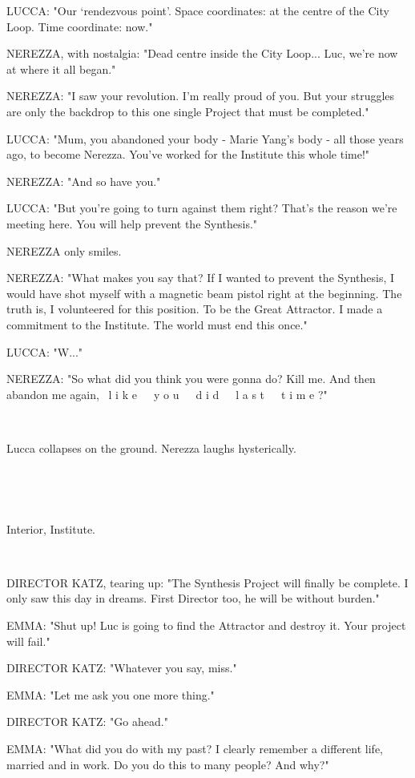 \documentclass[11pt]{article}
\begin{document}
LUCCA: "Our `rendezvous point'.
Space coordinates: at the centre of the City Loop. 
Time coordinate: now."

NEREZZA, with nostalgia: "Dead centre inside the City Loop...
Luc, we're now at where it all began."

NEREZZA: "I saw your revolution. 
I'm really proud of you.
But your struggles are only the backdrop to this one single Project that must be completed."

LUCCA: "Mum, you abandoned your body - Marie Yang's body - all those years ago, to become Nerezza.
You've worked for the Institute this whole time!"

NEREZZA: "And so have you."

LUCCA: "But you're going to turn against them right?
That's the reason we're meeting here.
You will help prevent the Synthesis."

NEREZZA only smiles.

NEREZZA: "What makes you say that?
If I wanted to prevent the Synthesis, I would have shot myself with a magnetic beam pistol right at the beginning.
The truth is, I volunteered for this position.
To be the Great Attractor.
I made a commitment to the Institute.
The world must end this once."

LUCCA: "W..."

NEREZZA: "So what did you think you were gonna do?
Kill me.
And then abandon me again,  \ 
l i k e\ \ \ y o u\ \ \ d i d\ \ \ l a s t\ \ \ t i m e ?"

\ 

Lucca collapses on the ground. 
Nerezza laughs hysterically.

\ 

\ 

Interior, Institute.

\ 

DIRECTOR KATZ, tearing up: "The Synthesis Project will finally be complete.
I only saw this day in dreams.
First Director too, he will be without burden."

EMMA: "Shut up! Luc is going to find the Attractor and destroy it.
Your project will fail."

DIRECTOR KATZ: "Whatever you say, miss."

EMMA: "Let me ask you one more thing."

DIRECTOR KATZ: "Go ahead."

EMMA: "What did you do with my past?
I clearly remember a different life, married and in work.
Do you do this to many people?
And why?"
\end{document}
